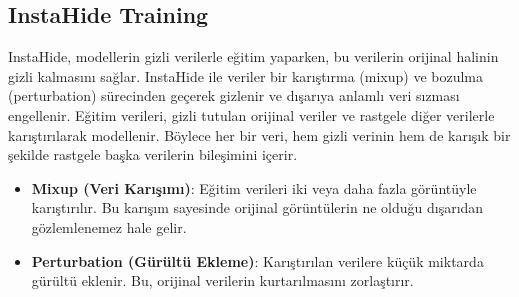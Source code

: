 \newpage

\subsection{InstaHide Training}

InstaHide, modellerin gizli verilerle eğitim yaparken, bu verilerin orijinal halinin gizli kalmasını sağlar. InstaHide ile veriler bir karıştırma (mixup) ve bozulma (perturbation) sürecinden geçerek gizlenir ve dışarıya anlamlı veri sızması engellenir. Eğitim verileri, gizli tutulan orijinal veriler ve rastgele diğer verilerle karıştırılarak modellenir. Böylece her bir veri, hem gizli verinin hem de karışık bir şekilde rastgele başka verilerin bileşimini içerir.

\begin{itemize}
    \item \textbf{Mixup (Veri Karışımı)}: Eğitim verileri iki veya daha fazla görüntüyle karıştırılır. Bu karışım sayesinde orijinal görüntülerin ne olduğu dışarıdan gözlemlenemez hale gelir.
    \item \textbf{Perturbation (Gürültü Ekleme)}: Karıştırılan verilere küçük miktarda gürültü eklenir. Bu, orijinal verilerin kurtarılmasını zorlaştırır.
\end{itemize}

\newpage